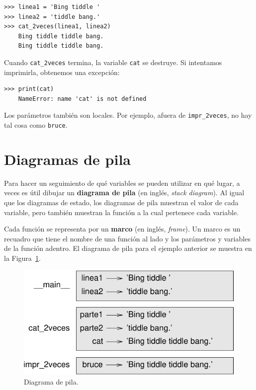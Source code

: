 \documentclass[10pt]{book}
\begin{document}
\begin{verbatim}
>>> linea1 = 'Bing tiddle '
>>> linea2 = 'tiddle bang.'
>>> cat_2veces(linea1, linea2)
    Bing tiddle tiddle bang.
    Bing tiddle tiddle bang.
\end{verbatim}
%
Cuando \verb"cat_2veces" termina, la variable {\tt cat}
se destruye.  Si intentamos imprimirla, obtenemos una excepción:

\begin{verbatim}
>>> print(cat)
    NameError: name 'cat' is not defined
\end{verbatim}
%
Los parámetros también son locales.
Por ejemplo, afuera de \verb"impr_2veces", no hay
tal cosa como {\tt bruce}.


\section{Diagramas de pila}
\label{stackdiagram}

Para hacer un seguimiento de qué variables se pueden utilizar en qué lugar, a veces es
útil dibujar un {\bf diagrama de pila} (en inglés, {\em stack diagram}).  Al igual que los diagramas de estado,
los diagramas de pila muestran el valor de cada variable, pero también muestran la
función a la cual pertenece cada variable.

Cada función se representa por un {\bf marco} (en inglés, {\em frame}).  Un marco es un recuadro que tiene
el nombre de una función al lado y los parámetros y variables de
la función adentro.  El diagrama de pila para el ejemplo anterior se
muestra en la Figura~\ref{fig.stack}.

\begin{figure}
\centerline
{\includegraphics[scale=0.8]{figs/stack.pdf}}
\caption{Diagrama de pila.}
\label{fig.stack}
\end{figure}
\end{document}
